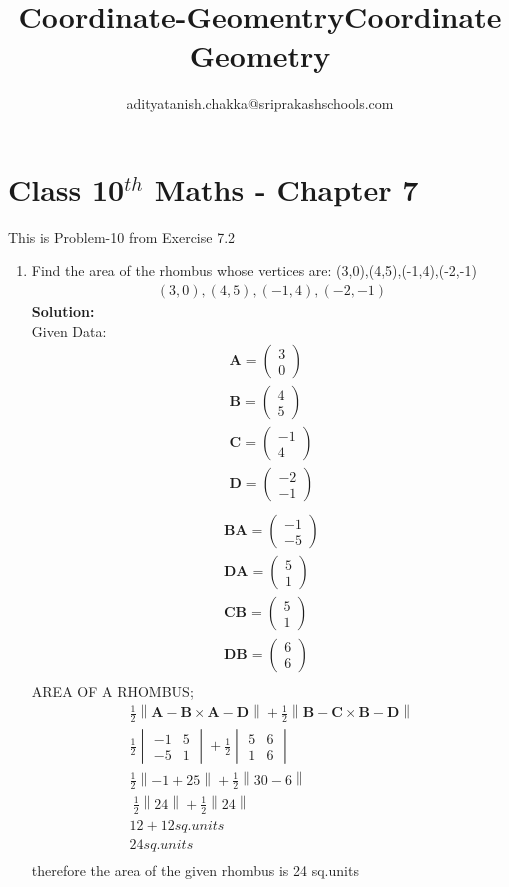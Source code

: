 \documentclass[10pt]{article}
\title{Coordinate-Geomentry}
\title{Coordinate Geometry}
\author{adityatanish.chakka@sriprakashschools.com}
\newcommand{\myvec}[1]{\ensuremath{\begin{pmatrix}#1\end{pmatrix}}}
\newcommand{\mydet}[1]{\ensuremath{\begin{vmatrix}#1\end{vmatrix}}}
\newcommand{\solution}{\noindent \textbf{Solution: }}
\providecommand{\norm}[1]{\left\lVert#1\right\rVert}
\let\vec\mathbf
\begin{document}
\maketitle
\section*{Class 10$^{th}$ Maths - Chapter 7}
This is Problem-10 from Exercise 7.2
\begin{enumerate}
\item Find the area of the rhombus whose vertices are:
(3,0),(4,5),(-1,4),(-2,-1)
\begin{align}
{(3,0),(4,5),(-1,4),(-2,-1)}
\end{align}
\solution \\

Given Data:
\begin{align}
\vec{A} = \myvec{3\\0}\\
\vec{B} = \myvec{4\\5}\\
\vec{C} = \myvec{-1\\4}\\
\vec{D} = \myvec{-2\\-1}\\
\end{align}
\begin{align}
\vec{BA} = \myvec{-1\\-5}\\
\vec{DA} = \myvec{5\\1}\\
\vec{CB} = \myvec{5\\1}\\
\vec{DB} = \myvec{6\\6}\\
\end{align}
AREA OF A RHOMBUS;
\begin{align}
\frac{1}{2}\norm{\vec{A}-\vec{B}\times \vec{A}-\vec{D}}+\frac{1}{2}\norm{\vec{B}-\vec{C}\times \vec{B}-\vec{D}}\\
\frac{1}{2}\mydet{-1 & 5\\ -5 & 1}+\frac{1}{2}\mydet{5 & 6\\ 1 & 6}\\
\frac{1}{2}\norm{-1+25}+\frac{1}{2}\norm{30-6}\\\
\frac{1}{2}\norm{24}+\frac{1}{2}\norm{24}\\
12+12 sq.units\\
24 sq.units\\
\end{align}
therefore the area of the given rhombus is 24 sq.units
\end{enumerate}
\end{document}
